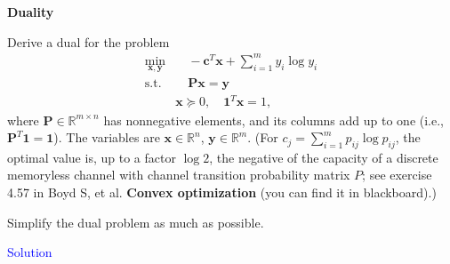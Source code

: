 \item[\uppercase\expandafter{\romannumeral4}.]\textbf{Duality}

Derive a dual for the problem
\begin{align*}
\min_{\mathbf{x, y}} &\quad -\mathbf{c}^T \mathbf{x} + \sum_{i=1}^m y_i \log y_i \\
\text{s.t.} &\quad \mathbf{P x = y} \\
& \mathbf{x} \succeq 0, \quad \mathbf{1}^T \mathbf{x} = 1,
\end{align*}
where $\mathbf{P} \in \mathbb{R}^{m \times n}$ has nonnegative elements, and its columns add up to one (i.e., $\mathbf{P}^T \mathbf{1} = \mathbf{1}$). The variables are $\mathbf{x} \in \mathbb{R}^n$, $\mathbf{y} \in \mathbb{R}^m$. (For $c_j = \sum_{i=1}^m p_{ij} \log p_{ij}$, the optimal value is, up to a factor $\log 2$, the negative of the capacity of a discrete memoryless channel with channel transition probability matrix $P$; see exercise 4.57 in Boyd S, et al. \textbf{Convex optimization} (you can find it in blackboard).)

Simplify the dual problem as much as possible.

\textcolor{blue}{Solution}

